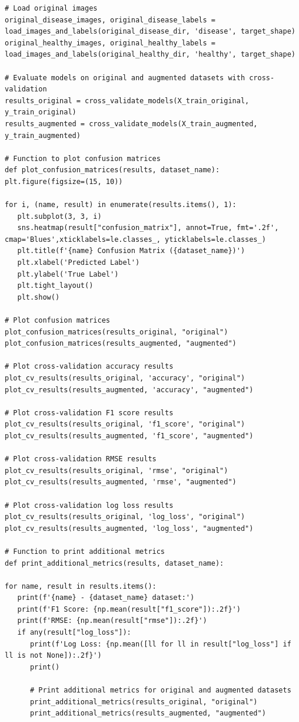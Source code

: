 \documentclass[phd]{ndsu-thesis-2022}
\begin{document}
{\begin{lstlisting}[caption={},
xleftmargin=5.5pt,xrightmargin=3pt,
frame=trBL, 
backgroundcolor=\color{black!10!white}]
# Load original images
original_disease_images, original_disease_labels = load_images_and_labels(original_disease_dir, 'disease', target_shape)
original_healthy_images, original_healthy_labels = load_images_and_labels(original_healthy_dir, 'healthy', target_shape)

# Evaluate models on original and augmented datasets with cross-validation
results_original = cross_validate_models(X_train_original, y_train_original)
results_augmented = cross_validate_models(X_train_augmented, y_train_augmented)

# Function to plot confusion matrices
def plot_confusion_matrices(results, dataset_name):
plt.figure(figsize=(15, 10))

for i, (name, result) in enumerate(results.items(), 1):
   plt.subplot(3, 3, i)
   sns.heatmap(result["confusion_matrix"], annot=True, fmt='.2f', cmap='Blues',xticklabels=le.classes_, yticklabels=le.classes_)
   plt.title(f'{name} Confusion Matrix ({dataset_name})')
   plt.xlabel('Predicted Label')
   plt.ylabel('True Label')
   plt.tight_layout()
   plt.show()

# Plot confusion matrices
plot_confusion_matrices(results_original, "original")
plot_confusion_matrices(results_augmented, "augmented")

# Plot cross-validation accuracy results
plot_cv_results(results_original, 'accuracy', "original")
plot_cv_results(results_augmented, 'accuracy', "augmented")

# Plot cross-validation F1 score results
plot_cv_results(results_original, 'f1_score', "original")
plot_cv_results(results_augmented, 'f1_score', "augmented")

# Plot cross-validation RMSE results
plot_cv_results(results_original, 'rmse', "original")
plot_cv_results(results_augmented, 'rmse', "augmented")

# Plot cross-validation log loss results
plot_cv_results(results_original, 'log_loss', "original")
plot_cv_results(results_augmented, 'log_loss', "augmented")

# Function to print additional metrics
def print_additional_metrics(results, dataset_name):

for name, result in results.items():
   print(f'{name} - {dataset_name} dataset:')
   print(f'F1 Score: {np.mean(result["f1_score"]):.2f}')
   print(f'RMSE: {np.mean(result["rmse"]):.2f}')
   if any(result["log_loss"]):
      print(f'Log Loss: {np.mean([ll for ll in result["log_loss"] if ll is not None]):.2f}')
      print()

      # Print additional metrics for original and augmented datasets
      print_additional_metrics(results_original, "original")
      print_additional_metrics(results_augmented, "augmented")
\end{lstlisting}
}
	
\end{document}
